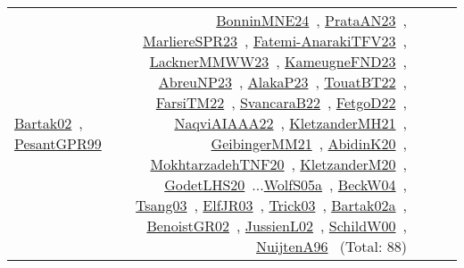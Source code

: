 {\begin{longtable}{p{3cm}r>{\raggedright\arraybackslash}p{6cm}>{\raggedright\arraybackslash}p{6cm}>{\raggedright\arraybackslash}p{8cm}}
\href{../works/Bartak02.pdf}{Bartak02}~\cite{Bartak02}, \href{../works/PesantGPR99.pdf}{PesantGPR99}~\cite{PesantGPR99} & \href{../works/BonninMNE24.pdf}{BonninMNE24}~\cite{BonninMNE24}, \href{../works/PrataAN23.pdf}{PrataAN23}~\cite{PrataAN23}, \href{../works/MarliereSPR23.pdf}{MarliereSPR23}~\cite{MarliereSPR23}, \href{../works/Fatemi-AnarakiTFV23.pdf}{Fatemi-AnarakiTFV23}~\cite{Fatemi-AnarakiTFV23}, \href{../works/LacknerMMWW23.pdf}{LacknerMMWW23}~\cite{LacknerMMWW23}, \href{../works/KameugneFND23.pdf}{KameugneFND23}~\cite{KameugneFND23}, \href{../works/AbreuNP23.pdf}{AbreuNP23}~\cite{AbreuNP23}, \href{../works/AlakaP23.pdf}{AlakaP23}~\cite{AlakaP23}, \href{../works/TouatBT22.pdf}{TouatBT22}~\cite{TouatBT22}, \href{../works/FarsiTM22.pdf}{FarsiTM22}~\cite{FarsiTM22}, \href{../works/SvancaraB22.pdf}{SvancaraB22}~\cite{SvancaraB22}, \href{../works/FetgoD22.pdf}{FetgoD22}~\cite{FetgoD22}, \href{../works/NaqviAIAAA22.pdf}{NaqviAIAAA22}~\cite{NaqviAIAAA22}, \href{../works/KletzanderMH21.pdf}{KletzanderMH21}~\cite{KletzanderMH21}, \href{../works/GeibingerMM21.pdf}{GeibingerMM21}~\cite{GeibingerMM21}, \href{../works/AbidinK20.pdf}{AbidinK20}~\cite{AbidinK20}, \href{../works/MokhtarzadehTNF20.pdf}{MokhtarzadehTNF20}~\cite{MokhtarzadehTNF20}, \href{../works/KletzanderM20.pdf}{KletzanderM20}~\cite{KletzanderM20}, \href{../works/GodetLHS20.pdf}{GodetLHS20}~\cite{GodetLHS20}...\href{../works/WolfS05a.pdf}{WolfS05a}~\cite{WolfS05a}, \href{../works/BeckW04.pdf}{BeckW04}~\cite{BeckW04}, \href{../works/Tsang03.pdf}{Tsang03}~\cite{Tsang03}, \href{../works/ElfJR03.pdf}{ElfJR03}~\cite{ElfJR03}, \href{../works/Trick03.pdf}{Trick03}~\cite{Trick03}, \href{../works/Bartak02a.pdf}{Bartak02a}~\cite{Bartak02a}, \href{../works/BenoistGR02.pdf}{BenoistGR02}~\cite{BenoistGR02}, \href{../works/JussienL02.pdf}{JussienL02}~\cite{JussienL02}, \href{../works/SchildW00.pdf}{SchildW00}~\cite{SchildW00}, \href{../works/NuijtenA96.pdf}{NuijtenA96}~\cite{NuijtenA96} (Total: 88)\\
\end{longtable}
}

